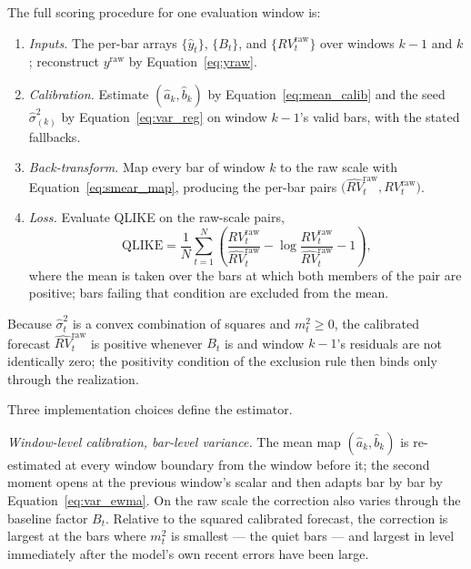 The full scoring procedure for one evaluation window is:
\begin{enumerate}
    \item \emph{Inputs.} The per-bar arrays $\{\hat{y}_t\}$, $\{B_t\}$,
    and $\{RV^{\mathrm{raw}}_t\}$ over windows $k-1$ and $k$; reconstruct
    $y^{\mathrm{raw}}$ by Equation~\eqref{eq:yraw}.
    \item \emph{Calibration.} Estimate $(\hat{a}_k, \hat{b}_k)$ by
    Equation~\eqref{eq:mean_calib} and the seed $\hat{\sigma}^2_{(k)}$ by
    Equation~\eqref{eq:var_reg} on window $k-1$'s valid bars, with the
    stated fallbacks.
    \item \emph{Back-transform.} Map every bar of window $k$ to the raw
    scale with Equation~\eqref{eq:smear_map}, producing the per-bar pairs
    $\bigl(\widehat{RV}_t^{\mathrm{raw}}, RV_t^{\mathrm{raw}}\bigr)$.
    \item \emph{Loss.} Evaluate QLIKE on the raw-scale pairs,
    \begin{equation}
        \mathrm{QLIKE}
        = \frac{1}{N}\sum_{t=1}^{N}
          \left(
            \frac{RV_t^{\mathrm{raw}}}{\widehat{RV}_t^{\mathrm{raw}}}
            - \log\frac{RV_t^{\mathrm{raw}}}{\widehat{RV}_t^{\mathrm{raw}}}
            - 1
          \right),
        \label{eq:qlike_raw}
    \end{equation}
    where the mean is taken over the bars at which both members of the pair
    are positive; bars failing that condition are excluded from the mean.
\end{enumerate}
Because $\hat{\sigma}^2_t$ is a convex combination of squares and
$m_t^2 \ge 0$, the
calibrated forecast $\widehat{RV}_t^{\mathrm{raw}}$ is positive whenever
$B_t$ is and window $k-1$'s residuals are not identically zero; the
positivity condition of the exclusion rule then binds only through the
realization.

Three implementation choices define the estimator.

\emph{Window-level calibration, bar-level variance.} The mean map
$(\hat{a}_k, \hat{b}_k)$ is re-estimated at every window boundary from
the window before it; the second moment opens at the previous window's
scalar and then adapts bar by bar by Equation~\eqref{eq:var_ewma}. On
the raw scale the correction also varies through the baseline factor
$B_t$. Relative to the squared calibrated forecast, the correction is
largest at the bars where $m_t^2$ is smallest --- the quiet bars ---
and largest in level immediately after the model's own recent errors
have been large.

